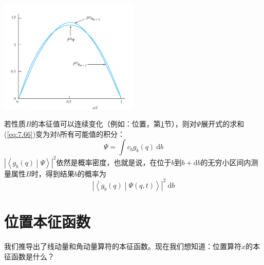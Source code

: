 \begin{examplebox}
        \vspace{1em}
        \begin{center}
            \includegraphics[width=0.5\textwidth]{Figures/7.3.png}
            \label{fig:7.3}
        \end{center}
        \vspace{1em}
    \end{examplebox}

    若性质$B$的本征值可以连续变化（例如：位置，第\ref{sec:7.7 Position Eigenfunctions}节），则对$\Psi$展开式的求和(\ref{eq:7.66})变为对$b$所有可能值的积分：
    \begin{equation}
        \Psi = \int c_bg_b\left(q\right)\:\mathrm{d}b
        \label{eq:7.75}
    \end{equation}
    $\left| \left\langle g_b\left(q\right) \middle| \Psi \right\rangle \right|^2$依然是概率密度，也就是说，在位于$b$到$b+\mathrm{d}b$的无穷小区间内测量属性$B$时，得到结果$b$的概率为
    \begin{equation}
        \left| \left\langle g_b\left(q\right) \middle| \Psi\left(q,t\right) \right\rangle \right|^2\:\mathrm{d}b
        \label{eq:7.76}
    \end{equation}

\section{位置本征函数}
\label{sec:7.7 Position Eigenfunctions}
    我们推导出了线动量和角动量算符的本征函数。现在我们想知道：位置算符$\hat{x}$的本征函数是什么？

